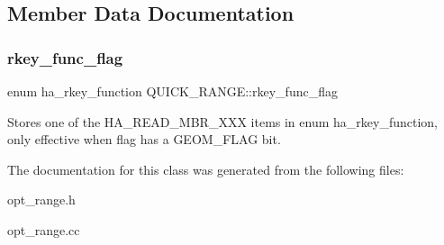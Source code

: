 \subsection{Member Data Documentation}
\mbox{\label{classQUICK__RANGE_aff9fa5a812d1fe709a9aea62a3c83662}} 
\subsubsection{\texorpdfstring{rkey\+\_\+func\+\_\+flag}{rkey\_func\_flag}}
{\footnotesize\ttfamily enum ha\+\_\+rkey\+\_\+function Q\+U\+I\+C\+K\+\_\+\+R\+A\+N\+G\+E\+::rkey\+\_\+func\+\_\+flag}

Stores one of the H\+A\+\_\+\+R\+E\+A\+D\+\_\+\+M\+B\+R\+\_\+\+X\+XX items in enum ha\+\_\+rkey\+\_\+function, only effective when flag has a G\+E\+O\+M\+\_\+\+F\+L\+AG bit. 

The documentation for this class was generated from the following files\+:\begin{DoxyCompactItemize}
\item 
opt\+\_\+range.\+h\item 
opt\+\_\+range.\+cc\end{DoxyCompactItemize}
